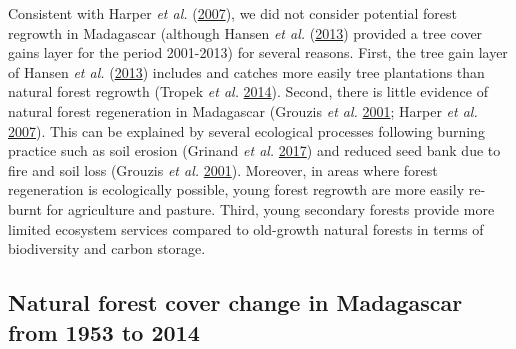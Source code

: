 \documentclass[]{article}
\theoremstyle{definition}
\theoremstyle{definition}
\theoremstyle{definition}
\theoremstyle{remark}
\begin{document}
Consistent with Harper \emph{et al.}
(\protect\hyperlink{ref-Harper2007}{2007}), we did not consider
potential forest regrowth in Madagascar (although Hansen \emph{et al.}
(\protect\hyperlink{ref-Hansen2013}{2013}) provided a tree cover gains
layer for the period 2001-2013) for several reasons. First, the tree
gain layer of Hansen \emph{et al.}
(\protect\hyperlink{ref-Hansen2013}{2013}) includes and catches more
easily tree plantations than natural forest regrowth (Tropek \emph{et
al.} \protect\hyperlink{ref-Tropek2014}{2014}). Second, there is little
evidence of natural forest regeneration in Madagascar (Grouzis \emph{et
al.} \protect\hyperlink{ref-Grouzis2001}{2001}; Harper \emph{et al.}
\protect\hyperlink{ref-Harper2007}{2007}). This can be explained by
several ecological processes following burning practice such as soil
erosion (Grinand \emph{et al.}
\protect\hyperlink{ref-Grinand2017}{2017}) and reduced seed bank due to
fire and soil loss (Grouzis \emph{et al.}
\protect\hyperlink{ref-Grouzis2001}{2001}). Moreover, in areas where
forest regeneration is ecologically possible, young forest regrowth are
more easily re-burnt for agriculture and pasture. Third, young secondary
forests provide more limited ecosystem services compared to old-growth
natural forests in terms of biodiversity and carbon storage.

\hypertarget{natural-forest-cover-change-in-madagascar-from-1953-to-2014}{%
\subsection{Natural forest cover change in Madagascar from 1953 to
2014}\label{natural-forest-cover-change-in-madagascar-from-1953-to-2014}}
\end{document}
